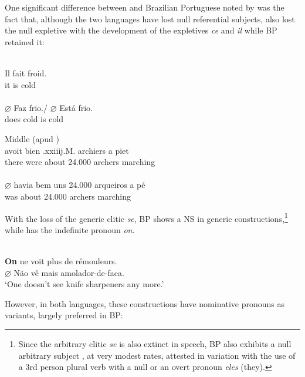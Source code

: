 \documentclass[output=paper]{langsci/langscibook}
\begin{document}
One significant difference between  and Brazilian Portuguese noted
by \citet{Duarte1995} was the fact that, although the two  languages
have lost null referential subjects,  also lost the null expletive
with the development of the expletives \emph{ce}  and \emph{il} while
\gls{BP} retained it:

\ea%
    \label{ex:26.11}
    \ea {}\\
    \gll    Il fait froid.\\
            it is  cold\\
    \ex {}\\
    \gll    \textbf{$\varnothing$}\tss{\Expl} Faz frio./ $\varnothing$\tss{\Expl} Está frio.\\
            {} does cold {} is cold\\
    \z
\z

\ea%
    \label{ex:26.12}
    \ea Middle  (apud \citealt[151]{Roberts1993})\\
     avoit bien .xxiiij.M.   archiers {a piet}\\
            there were about 24.000 archers marching\\
    \ex {}\\
    \gll    $\varnothing$\tss{\Expl} havia {bem uns} 24.000    arqueiros {a pé}\\
            {}  was about 24.000 archers marching\\
    \z
\z

With the loss of the generic clitic \emph{se}, BP shows a NS in
generic constructions,\footnote{Since the arbitrary clitic \emph{se} is also
    extinct in speech, \gls{BP} also exhibits a null arbitrary subject
    \parencite{Rodrigues2004}, at very modest rates, attested in variation
with the use of a 3rd person plural verb with a null or an overt pronoun
\emph{eles} (they).} while  has the indefinite pronoun \emph{on}.

\ea%
    \label{ex:26.13}
    \ea {}\\
        \textbf{On} ne voit plus de rémouleurs.
    \ex {}\\
        $\varnothing$ Não vê mais amolador-de-faca.\\
        ‘One doesn’t see knife sharpeners any more.’
    \z
\z

However, in both languages, these constructions have nominative pronouns as
variants, largely preferred in \gls{BP}:
\end{document}

